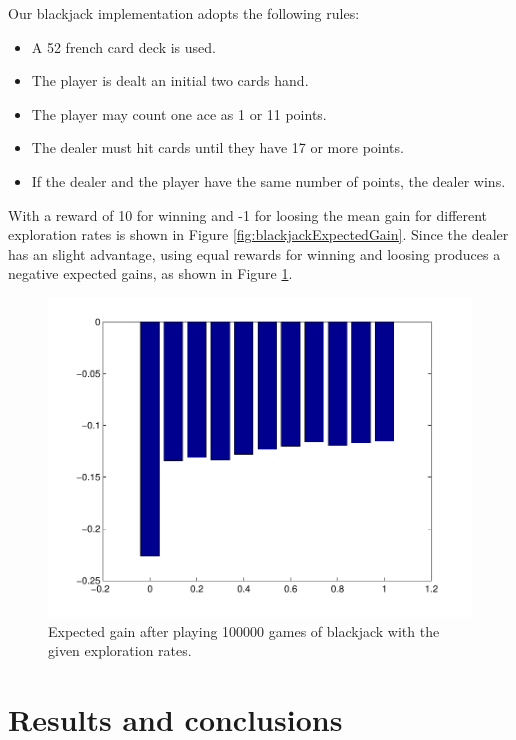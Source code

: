 \documentclass[12pt]{article}
\begin{document}
Our blackjack implementation adopts the following rules:

\begin{itemize}
  \item A 52 french card deck is used.
  \item The player is dealt an initial two cards hand.
  \item The player may count one ace as 1 or 11 points.
  \item The dealer must hit cards until they have 17 or more points.
  \item If the dealer and the player have the same number of points, the dealer wins.
\end{itemize}

With a reward of 10 for winning and -1 for loosing the mean gain for different exploration rates is shown in  Figure \ref{fig:blackjackExpectedGain}.
Since the dealer has an slight advantage, using equal rewards for winning and loosing produces a negative expected gains, as shown in Figure \ref{fig:blackjackExpectedGain1}.

\begin{figure}[btph!]
\centering
	\includegraphics[scale=0.4]{images/blackjackExpectedGain1}
	\caption{Expected gain after playing 100000 games of blackjack with the given exploration rates.}
	\label{fig:blackjackExpectedGain1}
\end{figure}

\section{Results and conclusions}

%
%
\end{document}
